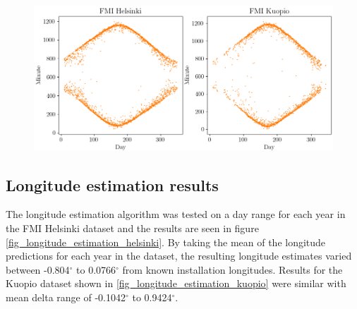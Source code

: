 


\begin{figure}[ht!]
\centering
\includegraphics[width=0.9\linewidth]{pics/first_last_helsinki_kuopio2}
\label{fig_first_last_kuopio_helsinki}
\end{figure}

\clearpage

\subsection{Longitude estimation results}
The longitude estimation algorithm was tested on a day range for each year in the FMI Helsinki dataset and the results are seen in figure \ref{fig_longitude_estimation_helsinki}. By taking the mean of the longitude predictions for each year in the dataset, the resulting longitude estimates varied between -0.804$^\circ$ to 0.0766$^\circ$ from known installation longitudes. Results for the Kuopio dataset shown in \ref{fig_longitude_estimation_kuopio} were similar with mean delta range of -0.1042$^\circ$ to 0.9424$^\circ$.


